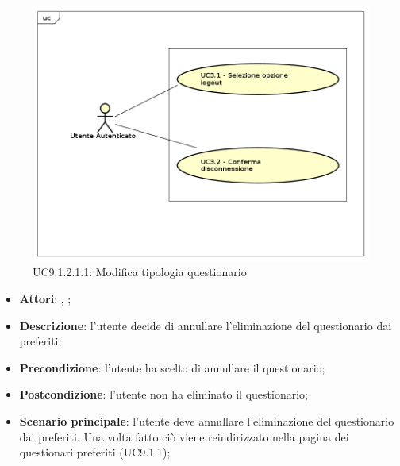 					\label{UC9.1.1.1.2}
					\begin{figure}[h]
						\centering
						\includegraphics[scale=0.7,keepaspectratio]{UML/UC9.png}
						\caption{UC9.1.2.1.1: Modifica tipologia questionario}
					\end{figure}
					\FloatBarrier
					\begin{itemize}
						\item \textbf{Attori}: \uau, \uaupro;
						\item \textbf{Descrizione}: l'utente decide di annullare l'eliminazione del questionario dai preferiti;
						\item \textbf{Precondizione}: l'utente ha scelto di annullare il questionario;
						\item \textbf{Postcondizione}: l'utente non ha eliminato il questionario;
						\item \textbf{Scenario principale}: l'utente deve annullare l'eliminazione del questionario dai preferiti. Una volta fatto ciò viene reindirizzato nella pagina dei questionari preferiti (UC9.1.1);
					\end{itemize}
		
